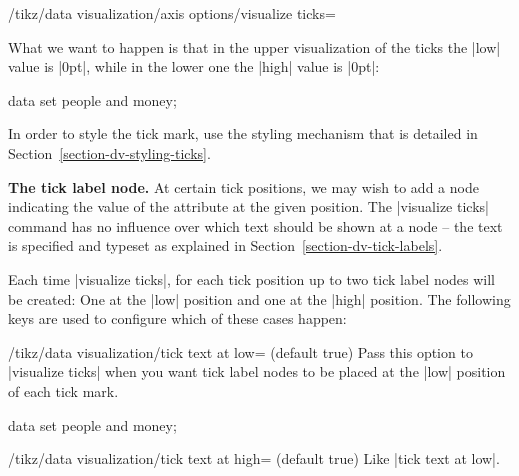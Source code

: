 \begin{key}{/tikz/data visualization/axis options/visualize ticks=}
\begin{itemize}
    What we want to happen is that in the upper visualization of the
    ticks the |low| value is |0pt|, while in the lower one the |high|
    value is |0pt|:    
\begin{codeexample}[]
\tikz \datavisualization [
    our system,
    x axis={attribute=time, length=3cm, ticks=many},
    left axis ={attribute=money},
    right axis={attribute=people},
    visualize as line/.list={people 1, people 2, money 1, money 2}]
  data set {people and money};  
\end{codeexample}
\end{itemize}
  In order to style the tick mark, use the styling mechanism that is
  detailed in Section~\ref{section-dv-styling-ticks}.

  \medskip
  \textbf{The tick label node.}
  At certain tick positions, we may wish to add a node indicating the
  value of the attribute at the given position. The |visualize ticks|
  command has no influence over which text should be shown at a node
  -- the text is specified and typeset as explained in
  Section~\ref{section-dv-tick-labels}.

  Each time |visualize ticks|, for each tick position up to two tick
  label nodes will be created: One at the |low| position and one at
  the |high| position. The following keys are used to configure which
  of these cases happen:
  \begin{key}{/tikz/data visualization/tick text at
      low= (default true)}
    Pass this option to |visualize ticks| when you want tick label
    nodes to be placed at the |low| position of each tick mark.
\begin{codeexample}[]
\tikz \datavisualization [
    our system,
    x axis={attribute=time, length=3cm, ticks=some},
    left axis ={attribute=money},
    right axis={attribute=people},
    visualize as line/.list={people 1, people 2, money 1, money 2}]
  data set {people and money};  
\end{codeexample}
  \end{key}
  \begin{key}{/tikz/data visualization/tick text at
      high= (default true)}
    Like |tick text at low|. 
  \end{key}
  

\end{key}
